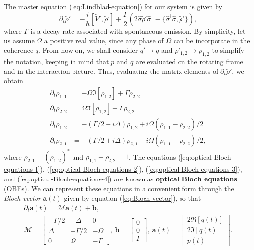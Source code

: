 The master equation (\ref{eq:Lindblad-equation}) for our system is given by
\begin{equation}
	\partial_t \tilde{\rho}' = - \frac{i}{\hbar} [\tilde{V}', \tilde{\rho}'] + \frac{\Gamma}{2} (2\hat{\sigma}\tilde{\rho}'\hat{\sigma}^{\dagger} - \{\hat{\sigma}^{\dagger}\hat{\sigma}, \tilde{\rho}'\}),
	\label{eq:master-equaton-two-level-system}
\end{equation}
where $ \Gamma $ is a decay rate associated with spontaneous emission. By simplicity, let us assume $ \Omega $ a positive real value, since any phase of $ \Omega $ can be incorporate in the coherence $ q $. From now on, we shall consider $ q' \rightarrow q $ and $ \rho'_{1,2} \rightarrow \rho_{1,2} $ to simplify the notation, keeping in mind that $ p $ and $ q $ are evaluated on the rotating frame and in the interaction picture. Thus, evaluating the matrix elements of $ \partial_t \tilde{\rho}' $, we obtain
\begin{align}
	\partial_t \rho_{1,1} &= - \Omega\Im[\rho_{1,2}] + \Gamma \rho_{2,2}
	\label{eq:optical-Bloch-equations-1}
	\\
	\partial_t \rho_{2,2} &= \Omega\Im[\rho_{1,2}] - \Gamma \rho_{2,2}
	\label{eq:optical-Bloch-equations-2}
	\\
	\partial_t \rho_{1,2} &= - (\Gamma / 2 - i \Delta) \rho_{1,2} + i\Omega (\rho_{1,1} - \rho_{2,2}) / 2
	\label{eq:optical-Bloch-equations-3}
	\\
	\partial_t \rho_{2,1} &= - (\Gamma / 2 + i \Delta) \rho_{2,1} - i\Omega (\rho_{1,1} - \rho_{2,2}) / 2,
	\label{eq:optical-Bloch-equations-4}
\end{align}
where $ \rho_{2,1} = (\rho_{1,2})^* $ and $ \rho_{1,1} + \rho_{2,2} = 1 $. The equations (\ref{eq:optical-Bloch-equations-1}), (\ref{eq:optical-Bloch-equations-2}), (\ref{eq:optical-Bloch-equations-3}), and (\ref{eq:optical-Bloch-equations-4}) are known as \textbf{optical Bloch equations} (OBEs). We can represent these equations in a convenient form through the \textit{Bloch vector} $ \mathbf{a}(t) $ given by equation (\ref{eq:Bloch-vector}), so that
\begin{gather}
	\partial_t \mathbf{a}(t) = \mathcal{M}\mathbf{a}(t) + \mathbf{b},
	\label{eq:optical-Bloch-equations-Bloch-vector}
	\\
	\mathcal{M} = \left[ \begin{matrix}
		-\Gamma/2 & - \Delta & 0 \\
		\Delta & -\Gamma/2 & -\Omega \\
		0 & \Omega & -\Gamma
	\end{matrix} \right],\ \mathbf{b} = \left[ \begin{matrix} 0 \\ 0 \\ \Gamma \end{matrix} \right],\ \mathbf{a}(t) = \left[ \begin{matrix} 2\Re[q(t)] \\ 2\Im[q(t)] \\ p(t) \end{matrix} \right].
\end{gather}
